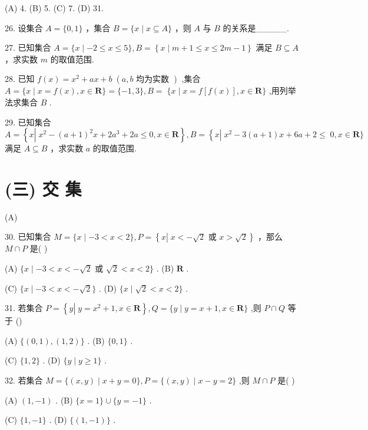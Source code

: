 \documentclass[10pt]{article}
\begin{document}
(A) 4. (B) 5. (C) 7. (D) 31.

26. 设集合 \(A = \{ 0,1\}\) ，集合 \(B = \{ x \mid  x \subseteq  A\}\) ，则 \(A\) 与 \(B\) 的关系是\_\_\_\_\_.

27. 已知集合 \(A = \{ x \mid   - 2 \leq  x \leq  5\} ,B = \left\{  {x \mid  m + 1 \leq  x \leq  {2m} - 1}\right\}\) 满足 \(B \subseteq  A\) ，求实数 \(m\) 的取值范围.

28. 已知 \(f\left( x\right)  = {x}^{2} + {ax} + b\;\left( {a,b\text{ 均为实数 }}\right)\) ,集合 \(A = \{ x \mid  x = f\left( x\right) ,x \in  \mathbf{R}\}  = \{  - 1,3\} ,B = \; \{ x \mid  x = f\left\lbrack  {f\left( x\right) }\right\rbrack  ,x \in  \mathbf{R}\}\) ,用列举法求集合 \(B\) .

29. 已知集合 \(A = \left\{  {x\left| {\;{x}^{2} - {\left( a + 1\right) }^{2}x + 2{a}^{3} + {2a} \leq  0}\right. ,x \in  \mathbf{R}}\right\}  ,B = \left\{  {x\left| {\;{x}^{2} - 3\left( {a + 1}\right) x + {6a} + 2 \leq  }\right. }\right. \; 0,x \in  \mathbf{R}\}\) 满足 \(A \subseteq  B\) ，求实数 \(a\) 的取值范围.

\section*{(三) 交 集}

(A)

30. 已知集合 \(M = \{ x \mid   - 3 < x < 2\} ,P = \left\{  {x\left| {\;x <  - \sqrt{2}\text{ 或 }x > \sqrt{2}}\right. }\right\}\) ，那么 \(M \cap  P\) 是( )

(A) \(\{ x \mid   - 3 < x <  - \sqrt{2}\) 或 \(\sqrt{2} < x < 2\}\) . (B) \(\mathbf{R}\) .

(C) \(\{ x \mid   - 3 < x <  - \sqrt{2}\}\) . (D) \(\{ x \mid  \sqrt{2} < x < 2\}\) .

31. 若集合 \(P = \left\{  {y\left| {\;y = {x}^{2} + 1}\right. ,x \in  \mathbf{R}}\right\}  ,Q = \{ y \mid  y = x + 1,x \in  \mathbf{R}\}\) ,则 \(P \cap  Q\) 等于 ()

(A) \(\{ \left( {0,1}\right) ,\left( {1,2}\right) \}\) . (B) \(\{ 0,1\}\) .

(C) \(\{ 1,2\}\) . (D) \(\{ y \mid  y \geq  1\}\) .

32. 若集合 \(M = \{ \left( {x,y}\right)  \mid  x + y = 0\} ,P = \{ \left( {x,y}\right)  \mid  x - y = 2\}\) ,则 \(M \cap  P\) 是( )

(A) \(\left( {1, - 1}\right)\) . (B) \(\{ x = 1\}  \cup  \{ y =  - 1\}\) .

(C) \(\{ 1, - 1\}\) . (D) \(\{ \left( {1, - 1}\right) \}\) .
\end{document}
